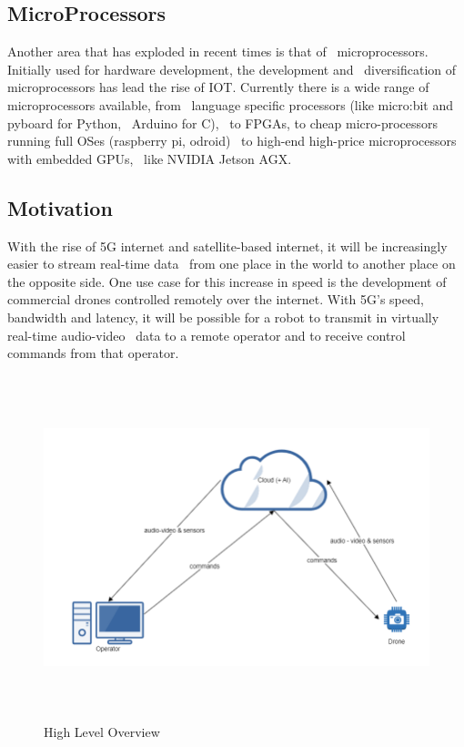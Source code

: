 \subsection{MicroProcessors}
\label{subsec:introduction-microprocessors}
Another area that has exploded in recent times is that of \
microprocessors.
Initially used for hardware development, the development and \
diversification of microprocessors has lead the rise of IOT.
Currently there is a wide range of microprocessors available, from \
language specific processors (like micro:bit and pyboard for Python, \
Arduino for C), \
to FPGAs, to cheap micro-processors running full OSes (raspberry pi, odroid) \
to high-end high-price microprocessors with embedded GPUs, \
like NVIDIA Jetson AGX.

\subsection{Motivation}
\label{subsec:introduction-motivation}
With the rise of 5G internet and satellite-based internet, it will be increasingly easier to stream real-time data \
from one place in the world to another place on the opposite side.
One use case for this increase in speed is the development of commercial drones controlled remotely over the internet.
With 5G's speed, bandwidth and latency, it will be possible for a robot to transmit in virtually real-time audio-video \
data to a remote operator and to receive control commands from that operator.

\begin{figure}[ht]
    \label{fig:overview1}
    \includegraphics[width=15cm, height=10cm, keepaspectratio]{img/overview1.PNG}
    \caption{High Level Overview}
\end{figure}

